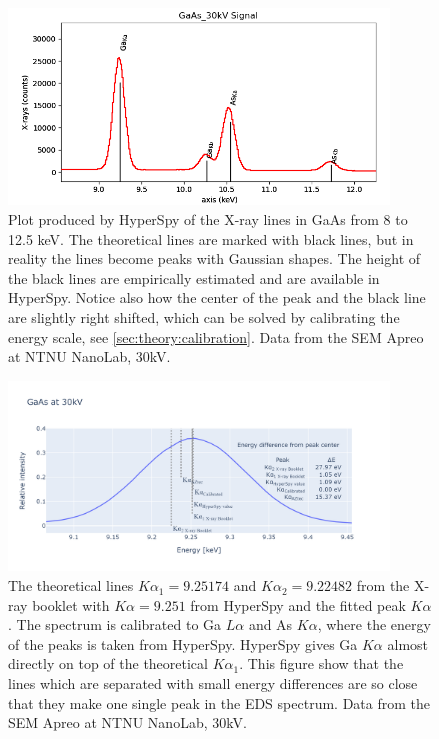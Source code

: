 \begin{figure}
    \centering
    \includegraphics[width=0.9\textwidth]{figures/GaAs30kV-8-12keV.png}
    \caption{
        Plot produced by HyperSpy of the X-ray lines in GaAs from 8 to 12.5 keV.
        The theoretical lines are marked with black lines, but in reality the lines become peaks with Gaussian shapes.
        The height of the black lines are empirically estimated and are available in HyperSpy.
        Notice also how the center of the peak and the black line are slightly right shifted, which can be solved by calibrating the energy scale, see \cref{sec:theory:calibration}.
        Data from the SEM Apreo at NTNU NanoLab, 30kV.
    }
    \label{fig:theory:GaAs30keV-8-12-keV}
\end{figure}

\begin{figure}
    \centering
    \includegraphics[width=0.9\textwidth]{figures/GaAs30kV-Ga-K-lines.png}
    \caption{
        The theoretical lines $K\alpha_1 = 9.25174$ and $K\alpha_2 = 9.22482$ from the X-ray booklet with $K\alpha = 9.251$ from HyperSpy and the fitted peak $K\alpha$.
        The spectrum is calibrated to Ga $L\alpha$ and As $K\alpha$, where the energy of the peaks is taken from HyperSpy.
        HyperSpy gives Ga $K\alpha$ almost directly on top of the theoretical $K\alpha_1$.
        This figure show that the lines which are separated with small energy differences are so close that they make one single peak in the EDS spectrum.
        Data from the SEM Apreo at NTNU NanoLab, 30kV.
    }
    \label{fig:theory:GaAs30keV-K-lines}
\end{figure}

